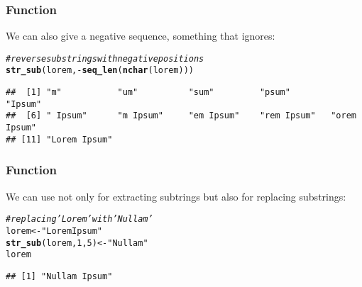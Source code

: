 \documentclass[12pt]{beamer}\usepackage[]{graphicx}\usepackage[]{color}
\makeatletter
\newcommand{\hlnum}[1]{\textcolor[rgb]{0.686,0.059,0.569}{#1}}%
\newcommand{\hlstr}[1]{\textcolor[rgb]{0.192,0.494,0.8}{#1}}%
\newcommand{\hlcom}[1]{\textcolor[rgb]{0.678,0.584,0.686}{\textit{#1}}}%
\newcommand{\hlopt}[1]{\textcolor[rgb]{0,0,0}{#1}}%
\newcommand{\hlstd}[1]{\textcolor[rgb]{0.345,0.345,0.345}{#1}}%
\newcommand{\hlkwb}[1]{\textcolor[rgb]{0.69,0.353,0.396}{#1}}%
\newcommand{\hlkwd}[1]{\textcolor[rgb]{0.737,0.353,0.396}{\textbf{#1}}}%
\newenvironment{kframe}{%
 \def\at@end@of@kframe{}%
 \ifinner\ifhmode%
  \def\at@end@of@kframe{\end{minipage}}%
  \begin{minipage}{\columnwidth}%
 \fi\fi%
 \def\FrameCommand##1{\hskip\@totalleftmargin \hskip-\fboxsep
 \colorbox{shadecolor}{##1}\hskip-\fboxsep
     \hskip-\linewidth \hskip-\@totalleftmargin \hskip\columnwidth}%
 \MakeFramed {\advance\hsize-\width
   \@totalleftmargin\z@ \linewidth\hsize
   \@setminipage}}%
 {\par\unskip\endMakeFramed%
 \at@end@of@kframe}
\newenvironment{knitrout}{}{} %
\makeatother
\begin{document}

\begin{frame}[fragile]
\frametitle{Function }

We can also give  a negative sequence, something that  ignores:
\begin{knitrout}\footnotesize
{}\color{fgcolor}\begin{kframe}
\begin{alltt}
\hlcom{# reverse substrings with negative positions}
\hlkwd{str_sub}\hlstd{(lorem,} \hlopt{-}\hlkwd{seq_len}\hlstd{(}\hlkwd{nchar}\hlstd{(lorem)))}
\end{alltt}
\begin{verbatim}
##  [1] "m"           "um"          "sum"         "psum"        "Ipsum"      
##  [6] " Ipsum"      "m Ipsum"     "em Ipsum"    "rem Ipsum"   "orem Ipsum" 
## [11] "Lorem Ipsum"
\end{verbatim}
\end{kframe}
\end{knitrout}

\end{frame}


\begin{frame}[fragile]
\frametitle{Function }

We can use  not only for extracting subtrings but also for replacing substrings:
\begin{knitrout}\footnotesize
{}\color{fgcolor}\begin{kframe}
\begin{alltt}
\hlcom{# replacing 'Lorem' with 'Nullam'}
\hlstd{lorem} \hlkwb{<-} \hlstr{"Lorem Ipsum"}
\hlkwd{str_sub}\hlstd{(lorem,} \hlnum{1}\hlstd{,} \hlnum{5}\hlstd{)} \hlkwb{<-} \hlstr{"Nullam"}
\hlstd{lorem}
\end{alltt}
\begin{verbatim}
## [1] "Nullam Ipsum"
\end{verbatim}
\end{kframe}
\end{knitrout}

\end{frame}

\end{document}
